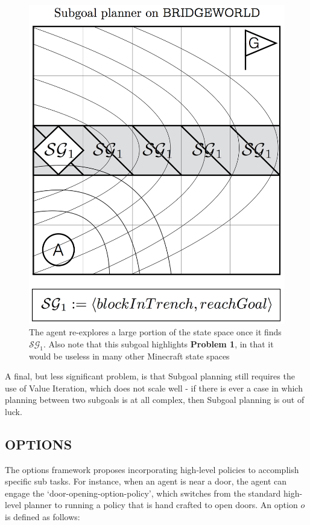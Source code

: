 \documentclass[]{article}
\begin{document}
\begin{figure}
\centering
\includegraphics[scale=0.22]{figures/bridgeworld_sg.png}
\caption{The agent re-explores a large portion of the state space 
once it finds $\mathcal{SG}_1$. Also note that this subgoal 
highlights {\bf Problem 1}, in that it would be useless in many other Minecraft state spaces}
\end{figure}


A final, but less significant problem, is that Subgoal planning still 
requires the use of Value Iteration, which does not scale well - if 
there is ever a case in which planning between two subgoals is 
at all complex, then Subgoal planning is out of luck.

\subsection{OPTIONS}

The options framework proposes incorporating high-level policies to 
accomplish specific sub tasks. For instance, when an agent is near 
a door, the agent can engage the `door-opening-option-policy', which 
switches from the standard high-level planner to running a policy 
that is hand crafted to open doors. An option $o$ is defined as follows:
\end{document}
